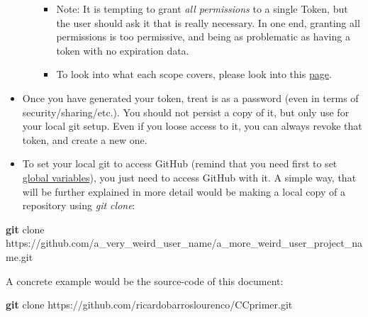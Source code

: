 \documentclass[
]{book}
\newenvironment{Shaded}{\begin{snugshade}}{\end{snugshade}}
\newcommand{\FunctionTok}[1]{\textcolor[rgb]{0.13,0.29,0.53}{\textbf{#1}}}
\newcommand{\NormalTok}[1]{#1}
\providecommand{\tightlist}{%
  \setlength{\itemsep}{0pt}\setlength{\parskip}{0pt}}
\begin{document}
\begin{itemize}
\begin{itemize}
    \begin{itemize}
    \tightlist
    \item
      Note: It is tempting to grant \emph{all permissions} to a single Token, but the user
      should ask it that is really necessary. In one end, granting all permissions
      is too permissive, and being as problematic as having a token with no
      expiration data.
    \item
      To look into what each scope covers, please look into this
      \href{https://docs.github.com/en/developers/apps/building-oauth-apps/scopes-for-oauth-apps\#available-scopes}{page}.
    \end{itemize}
  \end{itemize}
\item
  Once you have generated your token, treat is as a password (even in terms of
  security/sharing/etc.). You should not persist a copy of it, but only use for your
  local git setup. Even if you loose access to it, you can always revoke that
  token, and create a new one.
\item
  To set your local git to access GitHub (remind that you need first to set \href{https://ricardobarroslourenco.github.io/CCprimer/version-control-systems.html\#setting-up-your-local-git-client}{global variables}),
  you just need to access GitHub with it. A simple way, that will be further
  explained in more detail would be making a local copy of a repository using \emph{git clone}:
\end{itemize}

\begin{Shaded}
\begin{Highlighting}[]
\FunctionTok{git}\NormalTok{ clone https://github.com/a\_very\_weird\_user\_name/a\_more\_weird\_user\_project\_name.git}
\end{Highlighting}
\end{Shaded}

A concrete example would be the source-code of this document:

\begin{Shaded}
\begin{Highlighting}[]
\FunctionTok{git}\NormalTok{ clone https://github.com/ricardobarroslourenco/CCprimer.git}
\end{Highlighting}
\end{Shaded}
\end{document}
